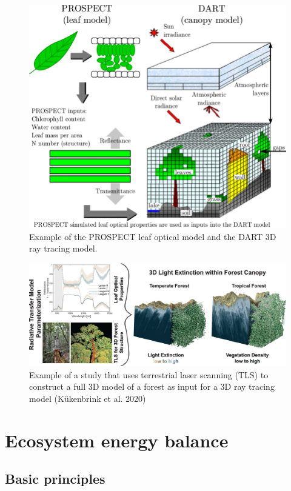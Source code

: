 \documentclass[12pt,oneside]{book}
\begin{document}
\begin{figure}

{\centering \includegraphics[width=0.8\linewidth]{figures/chap3/f327_DART} 

}

\caption{Example of the PROSPECT leaf optical model and the DART 3D ray tracing model.}\label{fig:f327}
\end{figure}

\begin{figure}

{\centering \includegraphics[width=0.8\linewidth]{figures/chap3/f328_TLS_RT} 

}

\caption{Example of a study that uses terrestrial laser scanning (TLS) to construct a full 3D model of a forest as input for a 3D ray tracing model (Kükenbrink et al. 2020) }\label{fig:f328}
\end{figure}

\section{Ecosystem energy balance}\label{ecosystem-energy-balance}

\subsection{Basic principles}\label{basic-principles}
\end{document}
